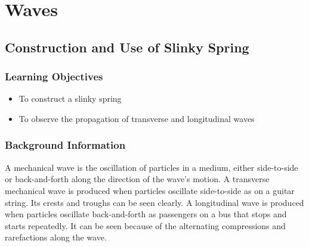 \section{Waves}





\subsection{Construction and Use of Slinky Spring}

\subsubsection*{Learning Objectives}
\begin{itemize}
\item{To construct a slinky spring} 
\item{To observe the propagation of transverse and longitudinal waves} 
\end{itemize}

\subsubsection*{Background Information}
A mechanical wave is the oscillation of particles in a medium, either side-to-side or back-and-forth along the direction of the wave's motion. A transverse mechanical wave is produced when particles oscillate side-to-side as on a guitar string. Its crests and troughs can be seen clearly. A longitudinal wave is produced when particles oscillate back-and-forth as passengers on a bus that stops and starts repeatedly. It can be seen because of the alternating compressions and rarefactions along the wave.  


